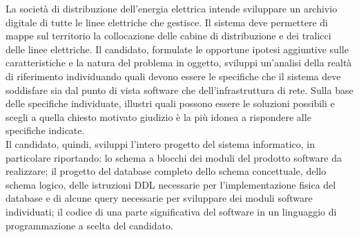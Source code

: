 La società di distribuzione dell'energia elettrica intende sviluppare un archivio digitale di tutte le linee elettriche che gestisce.
Il sistema deve permettere di mappe sul territorio la collocazione delle cabine di distribuzione e dei tralicci delle linee elettriche.
Il candidato, formulate le opportune ipotesi aggiuntive sulle caratteristiche e la natura del problema in oggetto, sviluppi un'analisi della realtà di
riferimento individuando quali devono essere le specifiche che il sistema deve soddisfare sia dal punto di vista software che dell'infrastruttura di rete.
Sulla base delle specifiche individuate, illustri quali possono essere le soluzioni possibili e scegli a quella chiesto motivato giudizio è la più idonea
a rispondere alle specifiche indicate. \\

Il candidato, quindi, sviluppi l'intero progetto del sistema informatico, in particolare riportando:
lo schema a blocchi dei moduli del prodotto software da realizzare;
il progetto del database completo dello schema concettuale, dello schema logico, delle istruzioni DDL necessarie
per l'implementazione fisica del database e di alcune query necessarie per sviluppare dei moduli software individuati;
il codice di una parte significativa del software in un linguaggio di programmazione a scelta del candidato.